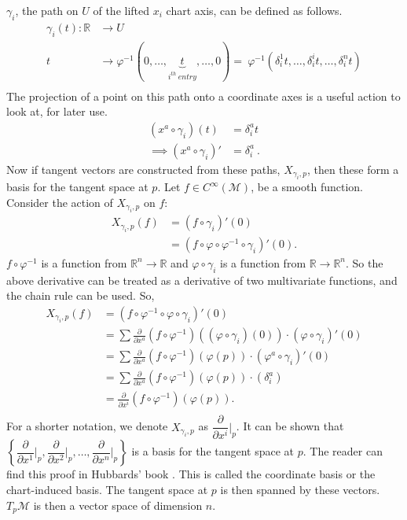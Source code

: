 \documentclass{article}
\begin{document}
\noindent $\gamma_i$, the path on $U$ of the lifted $x_i$ chart axis, can be defined as follows.
\begin{align*}
    \gamma_i(t) : \mathbb{R} &\to U\\
     t \  &\to \varphi^{-1}(0, \ldots, \underbrace{t}_{i^{th} \ entry}, \ldots, 0)
     = \ \varphi^{-1}(\delta^1_{i}t, \ldots, \delta^i_{i}t, \ldots, \delta^n_{i}t)\\
\end{align*}
The projection of a point on this path onto a coordinate axes is a useful action to look at, for later use. 
\begin{align*}
    (x^a\circ \gamma_i)(t) &= \delta_i^a t\\
    \implies (x^a\circ \gamma_i)' &= \delta_i^a \ .
\end{align*}
Now if tangent vectors are constructed from these paths, $X_{\gamma_i, p}$, then these form a basis for the tangent space at $p$. Let $f \in C^{\infty}(\mathcal{M})$, be a smooth function. Consider the action of $X_{\gamma_i, p}$ on $f$:
\begin{align*}
    X_{\gamma_i, p}(f) &= (f \circ \gamma_i)'(0)\\
    &= (f\circ \varphi \circ \varphi^{-1} \circ \gamma_i)'(0). 
\end{align*}
$f\circ \varphi^{-1}$ is a function from $\mathbb{R}^n \to \mathbb{R}$ and $\varphi \circ \gamma_i$ is a function from $\mathbb{R}\to \mathbb{R}^n$. So the above derivative can be treated as a derivative of two multivariate functions, and the chain rule can be used. So,
\begin{align*}
    X_{\gamma_i, p}(f) &= (f\circ \varphi^{-1} \circ \varphi \circ \gamma_i)'(0)\\
    &= \sum \frac{\partial}{\partial x^a} \left(f\circ \varphi^{-1}\right)((\varphi\circ\gamma_i)(0))\cdot (\varphi\circ\gamma_i)'(0)\\
    &= \sum \frac{\partial}{\partial x^a} \left(f\circ \varphi^{-1}\right)(\varphi(p))\cdot (\varphi^a\circ\gamma_i)'(0)\\
    &= \sum \frac{\partial}{\partial x^a} \left(f\circ \varphi^{-1}\right)(\varphi(p))\cdot (\delta_i^a)\\
    &= \frac{\partial}{\partial x^i} \left(f\circ \varphi^{-1}\right)(\varphi(p)) .\\
\end{align*}
For a shorter notation, we denote
$X_{\gamma_i, p}$ as $\dfrac{\partial}{\partial x^i}\bigg|_p$. It can be shown that $\left\{\dfrac{\partial}{\partial x^1}\bigg|_p, \dfrac{\partial}{\partial x^2}\bigg|_p, \ldots, \dfrac{\partial}{\partial x^n}\bigg|_p\right\}$ is a basis for the tangent space at  $p$. The reader can find this proof in Hubbards' book \cite{hubbard2009vector}.
This is called the coordinate basis or the chart-induced basis. The tangent space at $p$ is then spanned by these vectors. $T_p\mathcal{M}$ is then a vector space of dimension $n$.
\end{document}
